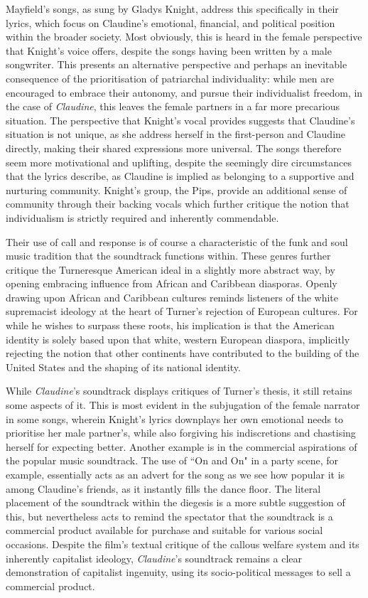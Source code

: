Mayfield's songs, as sung by Gladys Knight, address this specifically in their lyrics, which focus on Claudine's emotional, financial, and political position within the broader society.
Most obviously, this is heard in the female perspective that Knight's voice offers, despite the songs having been written by a male songwriter.
This presents an alternative perspective and perhaps an inevitable consequence of the prioritisation of patriarchal individuality:
while men are encouraged to embrace their autonomy, and pursue their individualist freedom, in the case of \textit{Claudine}, this leaves the female partners in a far more precarious situation.
The perspective that Knight's vocal provides suggests that Claudine's situation is not unique, as she address herself in the first-person and Claudine directly, making their shared expressions more universal.
The songs therefore seem more motivational and uplifting, despite the seemingly dire circumstances that the lyrics describe, as Claudine is implied as belonging to a supportive and nurturing community.
Knight's group, the Pips, provide an additional sense of community through their backing vocals which further critique the notion that individualism is strictly required and inherently commendable.

Their use of call and response is of course a characteristic of the funk and soul music tradition that the soundtrack functions within.
These genres further critique the Turneresque American ideal in a slightly more abstract way, by opening embracing influence from African and Caribbean diasporas.
Openly drawing upon African and Caribbean cultures reminds listeners of the white supremacist ideology at the heart of Turner's rejection of European cultures.
For while he wishes to surpass these roots, his implication is that the American identity is solely based upon that white, western European diaspora, implicitly rejecting the notion that other continents have contributed to the building of the United States and the shaping of its national identity.

While \textit{Claudine}'s soundtrack displays critiques of Turner's thesis, it still retains some aspects of it.
This is most evident in the subjugation of the female narrator in some songs, wherein Knight's lyrics downplays her own emotional needs to prioritise her male partner's, while also forgiving his indiscretions and chastising herself for expecting better.
Another example is in the commercial aspirations of the popular music soundtrack.
The use of ``On and On" in a party scene, for example, essentially acts as an advert for the song as we see how popular it is among Claudine's friends, as it instantly fills the dance floor.
The literal placement of the soundtrack within the diegesis is a more subtle suggestion of this, but nevertheless acts to remind the spectator that the soundtrack is a commercial product available for purchase and suitable for various social occasions.
Despite the film's textual critique of the callous welfare system and its inherently capitalist ideology, \textit{Claudine}'s soundtrack remains a clear demonstration of capitalist ingenuity, using its socio-political messages to sell a commercial product.




